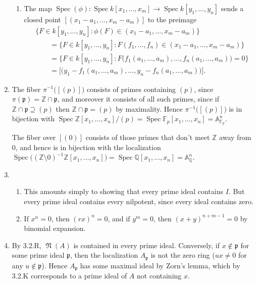 \documentclass{report}
\newcommand{\p}{\mathfrak{p}}
\newcommand{\A}{\mathbb{A}}
\newcommand{\F}{\mathbb{F}}
\newcommand{\Z}{\mathbb{Z}}
\newcommand{\Q}{\mathbb{Q}}
\DeclareMathOperator{\Spec}{Spec}
\DeclareMathOperator{\nilrad}{\mathfrak{N}}
\begin{document}
\begin{enumerate}[label=\textbf{3.2.\Alph*.}]
\begin{enumerate}[label=(\alph*)]
		      \item The map
		            $\Spec(\phi):\Spec k[x_1,\ldots,x_m]\to\Spec k[y_1,\ldots,y_n]$
		            sends a closed point $[(x_1-a_1,\ldots,x_m-a_m)]$ to the
		            preimage
		            \begin{align*}
			             & \{F\in k[y_1,\ldots,y_n]
			            : \phi(F)\in(x_1-a_1,\ldots,x_m-a_m)\}                 \\
			             & \qquad= \{F\in k[y_1,\ldots,y_n]
			            : F(f_1,\ldots,f_n)\in(x_1-a_1,\ldots,x_m-a_m)\}       \\
			             & \qquad= \{F\in k[y_1,\ldots,y_n]
			            : F\bigl(f_1(a_1,\ldots,a_m),\ldots,
			            f_n(a_1,\ldots,a_m)\bigr)=0\}                          \\
			             & \qquad= \bigl[\bigl(y_1-f_1(a_1,\ldots,a_m),\ldots,
				            y_n-f_n(a_1,\ldots,a_m)\bigr)\bigr].
		            \end{align*}
	      \end{enumerate}

	\item The fiber $\pi^{-1}\bigl([(p)]\bigr)$ consists of primes containing
	      $(p)$, since $\pi(\p)=\Z\cap\p$, and moreover it consists of all such
	      primes, since if $\Z\cap\p\supseteq(p)$ then $\Z\cap\p=(p)$ by
	      maximality. Hence $\pi^{-1}\bigl([(p)]\bigr)$ is in bijection with
	      $\Spec\Z[x_1,\ldots,x_n]/(p)=\Spec\F_p[x_1,\ldots,x_n]=\A^n_{\F_p}$.

	      The fiber over $[(0)]$ consists of those primes that don't meet $\Z$
	      away from 0, and hence is in bijection with the localization
	      $\Spec\bigl((\Z\setminus0)^{-1}\Z[x_1,\ldots,x_n]\bigr)
		      =\Spec\Q[x_1,\ldots,x_n]=\A^n_\Q$.

	\item
	      \begin{enumerate}[label=(\alph*)]
		      \item This amounts simply to showing that every prime ideal contains
		            $I$. But every prime ideal contains every nilpotent, since every
		            ideal contains zero.

		      \item If $x^n=0$, then $(rx)^n=0$, and if $y^m=0$, then
		            $(x+y)^{n+m-1}=0$ by binomial expansion.
	      \end{enumerate}

	\item By 3.2.R, $\nilrad(A)$ is contained in every prime ideal. Conversely, if
	      $x\notin\p$ for some prime ideal $\p$, then the localization $A_\p$ is
	      not the zero ring ($ux\ne0$ for any $u\notin\p$). Hence $A_\p$ has some
	      maximal ideal by Zorn's lemma, which by 3.2.K corresponds to a prime
	      ideal of $A$ not containing $x$.


\end{enumerate}
\end{document}
